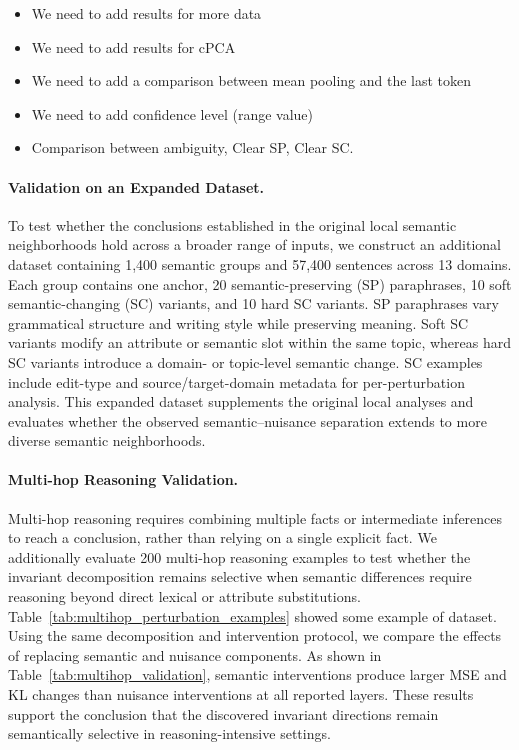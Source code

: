 
\begin{itemize}
    \item We need to add results for more data
    \item We need to add results for cPCA 
    \item We need to add a comparison between mean pooling and the last token 
    \item We need to add confidence level (range value)
    \item Comparison between ambiguity, Clear SP, Clear SC.
\end{itemize}

\paragraph{Validation on an Expanded Dataset.}
To test whether the conclusions established in the original local
semantic neighborhoods hold across a broader range of inputs, we
construct an additional dataset containing 1,400 semantic groups and
57,400 sentences across 13 domains. Each group contains one anchor,
20 semantic-preserving (SP) paraphrases, 10 soft semantic-changing
(SC) variants, and 10 hard SC variants. SP paraphrases vary grammatical
structure and writing style while preserving meaning. Soft SC variants
modify an attribute or semantic slot within the same topic, whereas
hard SC variants introduce a domain- or topic-level semantic change.
SC examples include edit-type and source/target-domain metadata for
per-perturbation analysis. This expanded dataset supplements the
original local analyses and evaluates whether the observed
semantic--nuisance separation extends to more diverse semantic
neighborhoods.

\paragraph{Multi-hop Reasoning Validation.}
Multi-hop reasoning requires combining multiple facts or intermediate
inferences to reach a conclusion, rather than relying on a single
explicit fact. We additionally evaluate 200 multi-hop reasoning
examples to test whether the invariant decomposition remains
selective when semantic differences require reasoning beyond direct
lexical or attribute substitutions. Table~\ref{tab:multihop_perturbation_examples} showed some example of dataset. Using the same decomposition and
intervention protocol, we compare the effects of replacing semantic
and nuisance components. As shown in
Table~\ref{tab:multihop_validation}, semantic interventions produce
larger MSE and KL changes than nuisance interventions at all reported
layers. These results support the conclusion that the discovered
invariant directions remain semantically selective in
reasoning-intensive settings.

